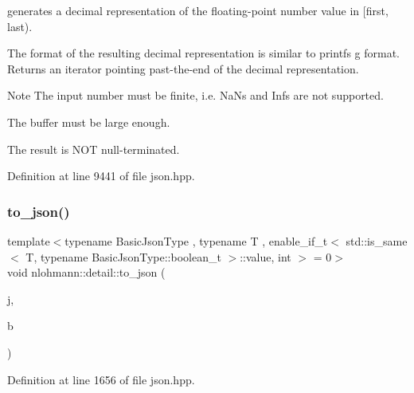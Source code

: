 generates a decimal representation of the floating-\/point number value in \mbox{[}first, last). 

The format of the resulting decimal representation is similar to printf\textquotesingle{}s g format. Returns an iterator pointing past-\/the-\/end of the decimal representation.

\begin{DoxyNote}{Note}
The input number must be finite, i.\+e. NaN\textquotesingle{}s and Inf\textquotesingle{}s are not supported. 

The buffer must be large enough. 

The result is N\+OT null-\/terminated. 
\end{DoxyNote}


Definition at line 9441 of file json.\+hpp.

\mbox{\label{namespacenlohmann_1_1detail_a1a804b98cbe89b7e44b698f2ca860490}} 
\subsubsection{\texorpdfstring{to\+\_\+json()}{to\_json()}\hspace{0.1cm}{\footnotesize\ttfamily [1/16]}}
{\footnotesize\ttfamily template$<$typename Basic\+Json\+Type , typename T , enable\+\_\+if\+\_\+t$<$ std\+::is\+\_\+same$<$ T, typename Basic\+Json\+Type\+::boolean\+\_\+t $>$\+::value, int $>$  = 0$>$ \\
void nlohmann\+::detail\+::to\+\_\+json (\begin{DoxyParamCaption}\item[{Basic\+Json\+Type \&}]{j,  }\item[{T}]{b }\end{DoxyParamCaption})\hspace{0.3cm}{\ttfamily [noexcept]}}



Definition at line 1656 of file json.\+hpp.

\mbox{\label{namespacenlohmann_1_1detail_a7356ed05cdbbb080cee80e1211e1c6c9}} 

